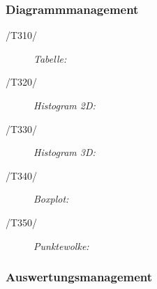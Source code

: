 	\subsubsection{Diagrammmanagement}
	
		\begin{description}
			
			\item[/T310/] \textit{Tabelle:}\par 

			\item[/T320/] \textit{Histogram 2D:}\par 
		
			\item[/T330/] \textit{Histogram 3D:}\par 

			\item[/T340/] \textit{Boxplot:}\par 

			\item[/T350/] \textit{Punktewolke:}\par 
			

			
		\end{description}
	
	\subsubsection{Auswertungsmanagement}


